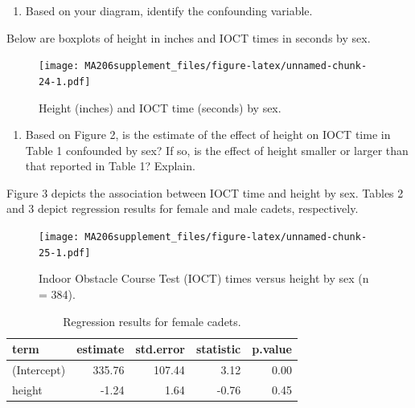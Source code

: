 \documentclass[]{book}
\providecommand{\tightlist}{%
  \setlength{\itemsep}{0pt}\setlength{\parskip}{0pt}}
\begin{document}
\vspace{1in}

\begin{enumerate}
\def\labelenumi{\arabic{enumi}.}
\setcounter{enumi}{11}
\tightlist
\item
  Based on your diagram, identify the confounding variable.
\end{enumerate}

\vspace{0.5in}

Below are boxplots of height in inches and IOCT times in seconds by sex.

\begin{figure}
\centering
\texttt{[image: MA206supplement\_files/figure-latex/unnamed-chunk-24-1.pdf]}
\caption{\label{fig:unnamed-chunk-24}Height (inches) and IOCT time (seconds) by sex.}
\end{figure}

\begin{enumerate}
\def\labelenumi{\arabic{enumi}.}
\setcounter{enumi}{12}
\tightlist
\item
  Based on Figure 2, is the estimate of the effect of height on IOCT time in Table 1 confounded by sex? If so, is the effect of height smaller or larger than that reported in Table 1? Explain.
\end{enumerate}

\vspace{1in}

\newpage

Figure 3 depicts the association between IOCT time and height by sex. Tables 2 and 3 depict regression results for female and male cadets, respectively.

\begin{figure}
\centering
\texttt{[image: MA206supplement\_files/figure-latex/unnamed-chunk-25-1.pdf]}
\caption{\label{fig:unnamed-chunk-25}Indoor Obstacle Course Test (IOCT) times versus height by sex (n = 384).}
\end{figure}

\begin{table}

\caption{\label{tab:unnamed-chunk-26}Regression results for female cadets.}
\centering
\begin{tabular}[t]{l|r|r|r|r}
\hline
term & estimate & std.error & statistic & p.value\\
\hline
(Intercept) & 335.76 & 107.44 & 3.12 & 0.00\\
\hline
height & -1.24 & 1.64 & -0.76 & 0.45\\
\hline
\end{tabular}
\end{table}
\end{document}
